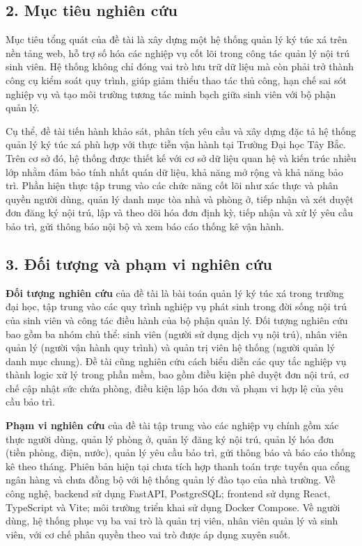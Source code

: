 \documentclass[13pt,a4paper]{extarticle}
\numberwithin{figure}{section}
\numberwithin{table}{section}
\begin{document}
	\subsection*{2. Mục tiêu nghiên cứu}
	
	Mục tiêu tổng quát của đề tài là xây dựng một hệ thống quản lý ký túc xá trên nền tảng web, hỗ trợ số hóa các nghiệp vụ cốt lõi trong công tác quản lý nội trú sinh viên. Hệ thống không chỉ đóng vai trò lưu trữ dữ liệu mà còn phải trở thành công cụ kiểm soát quy trình, giúp giảm thiểu thao tác thủ công, hạn chế sai sót nghiệp vụ và tạo môi trường tương tác minh bạch giữa sinh viên với bộ phận quản lý.
	
	Cụ thể, đề tài tiến hành khảo sát, phân tích yêu cầu và xây dựng đặc tả hệ thống quản lý ký túc xá phù hợp với thực tiễn vận hành tại Trường Đại học Tây Bắc. Trên cơ sở đó, hệ thống được thiết kế với cơ sở dữ liệu quan hệ và kiến trúc nhiều lớp nhằm đảm bảo tính nhất quán dữ liệu, khả năng mở rộng và khả năng bảo trì. Phần hiện thực tập trung vào các chức năng cốt lõi như xác thực và phân quyền người dùng, quản lý danh mục tòa nhà và phòng ở, tiếp nhận và xét duyệt đơn đăng ký nội trú, lập và theo dõi hóa đơn định kỳ, tiếp nhận và xử lý yêu cầu bảo trì, gửi thông báo nội bộ và xem báo cáo thống kê vận hành. 
	
	\subsection*{3. Đối tượng và phạm vi nghiên cứu}
	
	\textbf{Đối tượng nghiên cứu} của đề tài là bài toán quản lý ký túc xá trong trường đại học, tập trung vào các quy trình nghiệp vụ phát sinh trong đời sống nội trú của sinh viên và công tác điều hành của bộ phận quản lý. Đối tượng nghiên cứu bao gồm ba nhóm chủ thể: sinh viên (người sử dụng dịch vụ nội trú), nhân viên quản lý (người vận hành quy trình) và quản trị viên hệ thống (người quản lý danh mục chung). Đề tài cũng nghiên cứu cách biểu diễn các quy tắc nghiệp vụ thành logic xử lý trong phần mềm, bao gồm điều kiện phê duyệt đơn nội trú, cơ chế cập nhật sức chứa phòng, điều kiện lập hóa đơn và phạm vi hợp lệ của yêu cầu bảo trì.
	
	\textbf{Phạm vi nghiên cứu} của đề tài tập trung vào các nghiệp vụ chính gồm xác thực người dùng, quản lý phòng ở, quản lý đăng ký nội trú, quản lý hóa đơn (tiền phòng, điện, nước), quản lý yêu cầu bảo trì, gửi thông báo và báo cáo thống kê theo tháng. Phiên bản hiện tại chưa tích hợp thanh toán trực tuyến qua cổng ngân hàng và chưa đồng bộ với hệ thống quản lý đào tạo của nhà trường. Về công nghệ, backend sử dụng FastAPI, PostgreSQL; frontend sử dụng React, TypeScript và Vite; môi trường triển khai sử dụng Docker Compose. Về người dùng, hệ thống phục vụ ba vai trò là quản trị viên, nhân viên quản lý và sinh viên, với cơ chế phân quyền theo vai trò được áp dụng xuyên suốt.
	
\end{document}
